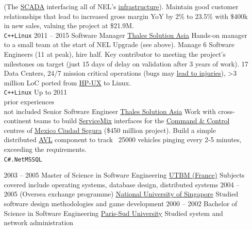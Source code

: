 \documentclass[9pt]{developercv} %
\begin{document}
\begin{entrylist}
{	(The \href{https://en.wikipedia.org/wiki/SCADA}{SCADA} interfacing all of NEL's
	\href{https://en.wikipedia.org/wiki/North_East_MRT_line\#Infrastructure}{infrastructure}).
	Maintain good customer relationships that lead to increased gross margin
	YoY by 2\% to 23.5\% with \$400k in new sales, valuing the project at \$21.9M.\\
	\texttt{C++}\slashsep\texttt{Linux}
  }
  \entry
  {2011 -- 2015}
  {Software Manager}
  {\href{http://www.thalesgroup.com}{Thales Solution Asia}}
  {
	Hands-on manager to a small team at the start of NEL Upgrade
	(see above). Manage 6 Software Engineers (11 at peak), hire half.
	Key contributor to meeting the project's milestones on target (just 15
	days of delay on validation after 3 years of work). 17 Data Centers, 24/7
	mission critical operations (bugs may
	\href{https://www.straitstimes.com/singapore/joo-koon-collision-software-glitch-in-signalling-system-results-in-second-train-misjudging}{lead
	  to injuries}), >3 million LoC ported from
	\href{https://en.wikipedia.org/wiki/HP-UX}{HP-UX}
    to Linux.\\
	\texttt{C++}\slashsep\texttt{Linux}
  }
  \entry
  {Up to 2011\\\footnotesize{prior experiences\\not included}}
  {Senior Software Engineer}
  {\href{http://www.thalesgroup.com}{Thales Solution Asia}}
  {
    Work with cross-continent teams to build
	\href{https://servicemix.apache.org/}{ServiceMix} interfaces for the
	\href{https://en.wikipedia.org/wiki/Command_and_control}{Command \& Control}
	centres of \href{https://www.youtube.com/watch?v=tvD9NkpsNas}{Mexico Ciudad Segura} (\$450 million project). Build a simple distributed \href{https://en.wikipedia.org/wiki/Automatic_vehicle_location}{AVL} component to track ~25000 vehicles pinging every 2-5 minutes, exceeding the requirements.\\
	\texttt{C\#}\slashsep\texttt{.Net}\slashsep\texttt{MSSQL}
  }
\end{entrylist}



\begin{entrylist}
	\entry
		{2003 -- 2005}
		{Master of Science in Software Engineering}
		{\href{https://www.utbm.fr/english/utbm/}{UTBM (France)}}
		{Subjects covered include operating systems, database design, distributed systems}
	\entry
		{2004 -- 2005}
		{(Oversea exchange programme)}
		{\href{https://nus.edu.sg/}{National University of Singapore}}
		{Studied software design methodologies and game development}
	\entry
		{2000 -- 2002}
		{Bachelor of Science in Software Engineering}
		{\href{https://en.wikipedia.org/wiki/Paris-Sud_University}{Paris-Sud University}}
		{Studied system and network administration}
\end{entrylist}
\end{document}
